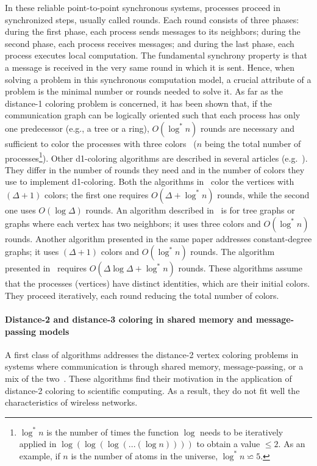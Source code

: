 \documentclass[11pt,english]{article}
\begin{document}
In these reliable point-to-point synchronous systems, processes
proceed in synchronized steps, usually called rounds. Each round
consists of three phases: during the first phase, each process sends
messages to its neighbors; during the second phase, each process
receives messages; and during the last phase, each process executes
local computation.  The fundamental synchrony property is that a
message is received in the very same round in which it is sent. Hence,
when solving a problem in this synchronous computation model, a
crucial attribute of a problem is the minimal number or rounds needed
to solve it.  As far as the distance-1 coloring problem is concerned,
it has been shown that, if the communication graph can be logically
oriented such that each process has only one predecessor (e.g., a tree
or a ring), $O(\log^*n)$ rounds are necessary and sufficient to color
the processes with three colors~\cite{CV86,L92} ($n$ being the total
number of processes\footnote{$\log^* n$ is the number of times the
  function $\log$ needs to be iteratively applied in $\log(\log(\log(
  ...(\log n))))$ to obtain a value $\leq 2$.  As an example, if $n$
  is the number of atoms in the universe, $\log^* n \backsimeq 5$.}).
Other d1-coloring algorithms are described in several articles
(e.g.~\cite{BE11,BEK14,GPS88,KW06}).  They differ in the number of
rounds they need and in the number of colors they use to implement
d1-coloring. Both the algorithms in~\cite{BE11,BEK14} color the
vertices with $(\Delta+1)$ colors; the first one requires
$O(\Delta+\log^* n)$ rounds, while the second one uses $O(\log
\Delta)$ rounds.  An algorithm described in~\cite{GPS88} is for tree
graphs or graphs where each vertex has two neighbors; it uses three
colors and $O(\log^* n)$ rounds. Another algorithm presented in the
same paper addresses constant-degree graphs; it uses $(\Delta+1)$
colors and $O(\log^* n)$ rounds. The algorithm presented
in~\cite{KW06} requires $O(\Delta \log \Delta +\log^* n)$ rounds.
These algorithms assume that the processes (vertices) have distinct
identities, which are their initial colors. They proceed iteratively,
each round reducing the total number of colors.

\paragraph{Distance-2 and distance-3 coloring in shared memory and
  message-passing  models}
A first class of algorithms addresses the distance-2 vertex coloring
problems in systems where communication is through shared memory,
message-passing, or a mix of the
two~\cite{BCGMBO05,BGMBC08,GMP02}. These algorithms find their
motivation in the application of distance-2 coloring to scientific
computing. As a result, they do not fit well the characteristics of
wireless networks.
\end{document}
